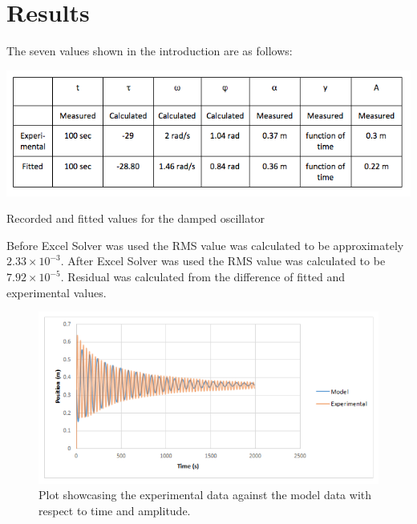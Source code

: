 \documentclass{article}
\begin{document}
  \section{Results}

  The seven values shown in the introduction are as follows:

  \begin{table}[!h]
    \centering
    \includegraphics[scale=.6]{table1.png}
    \caption{Recorded and fitted values for the damped oscillator}
    \label{table1}
  \end{table}

  Before Excel Solver was used the RMS value was calculated to be approximately $2.33 \times 10^{-3}$. After Excel Solver was used the RMS value was calculated to be $7.92 \times 10^{-5}$. Residual was calculated from the difference of fitted and experimental values.

  \clearpage

  \begin{figure}[!ht]
    \centering
    \includegraphics[scale=.65]{Model_vs_experiment.png}
    \caption{Plot showcasing the experimental data against the model data with respect to time and amplitude.}
    \label{mod_v_exp}
  \end{figure}
\end{document}
